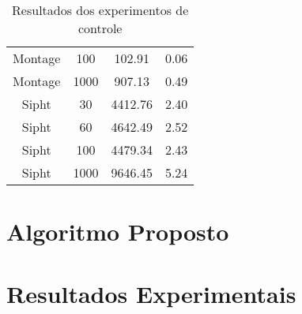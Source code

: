 \begin{table}
\begin{tabular}{|c|c|c|c|}
    Montage                        & 100               & 102.91             & 0.06                     \\
    Montage                        & 1000              & 907.13             & 0.49                     \\ \hline
    Sipht                          & 30                & 4412.76            & 2.40                     \\
    Sipht                          & 60                & 4642.49            & 2.52                     \\
    Sipht                          & 100               & 4479.34            & 2.43                     \\
    Sipht                          & 1000              & 9646.45            & 5.24                     \\ \hline
    \end{tabular}
    \caption {Resultados dos experimentos de controle}
    \label{tab:resultados_dvfs}
\end{table}



\section{Algoritmo Proposto}
\label{sec:algoritmo_proposto}

\section{Resultados Experimentais}
\label{sec:resultados_experimentais}

